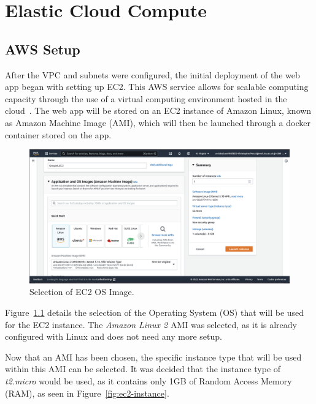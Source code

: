 \chapter{Elastic Cloud Compute}\label{ch:ec2}

\section{AWS Setup}\label{sec:aws-setup}

After the VPC and subnets were configured, the initial deployment of the web app began with setting up EC2.
This AWS service allows for scalable computing capacity through the use of a virtual computing environment hosted in the
cloud~\parencite{aws2022ec2}.
The web app will be stored on an EC2 instance of Amazon Linux, known as Amazon Machine Image (AMI), which will then be
launched through a docker container stored on the app.

\begin{figure}[!htbp]
    \centering
    \includegraphics[width=\textwidth]{resources/ec2/create-instance-application-and-os-images}
    \caption{Selection of EC2 OS Image.}
    \label{fig:ec2-os}
\end{figure}

Figure~\ref{fig:ec2-os} details the selection of the Operating System (OS) that will be used for the EC2 instance.
The \textit{Amazon Linux 2} AMI was selected, as it is already configured with Linux and does not need any more setup.

Now that an AMI has been chosen, the specific instance type that will be used within this AMI can be selected.
It was decided that the instance type of \textit{t2.micro} would be used, as it contains only 1GB of Random Access
Memory (RAM), as seen in Figure~\ref{fig:ec2-instance}.

